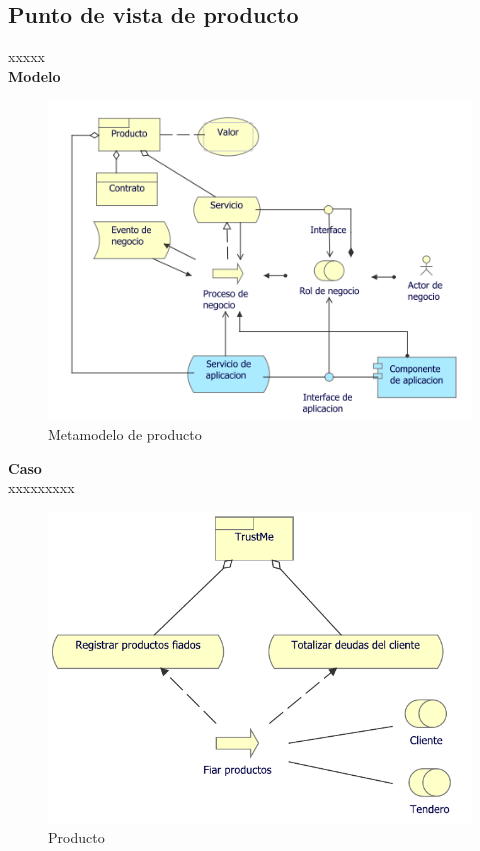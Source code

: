 	\subsection{Punto de vista de producto}
	{ xxxxx\\
		
		\textbf{Modelo}\\
		\begin{figure}[H]
			\centering
			\includegraphics[width=0.8\linewidth]{development/producto.png}
			\caption{Metamodelo de producto}
		\end{figure}
		
		\textbf{Caso}\\
		xxxxxxxxx\\
		
		\begin{figure}[H]
			\centering
			\includegraphics[width=0.8\linewidth]{development/producto.pdf}
			\caption{Producto}
		\end{figure}
	}